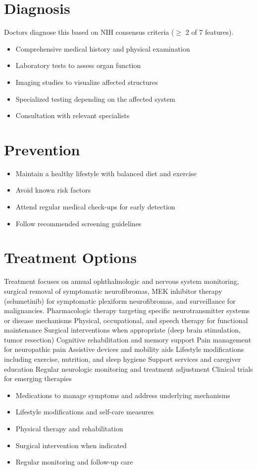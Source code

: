 \section{Diagnosis}
Doctors diagnose this based on NIH consensus criteria ($\ge$ 2 of 7 features).

\begin{itemize}[noitemsep]
  \item Comprehensive medical history and physical examination
  \item Laboratory tests to assess organ function
  \item Imaging studies to visualize affected structures
  \item Specialized testing depending on the affected system
  \item Consultation with relevant specialists
\end{itemize}
\section{Prevention}
\begin{itemize}[noitemsep]
  \item Maintain a healthy lifestyle with balanced diet and exercise
  \item Avoid known risk factors
  \item Attend regular medical check-ups for early detection
  \item Follow recommended screening guidelines
\end{itemize}
\section{Treatment Options}
Treatment focuses on annual ophthalmologic and nervous system monitoring, surgical removal of symptomatic neurofibromas, MEK inhibitor therapy (selumetinib) for symptomatic plexiform neurofibromas, and surveillance for malignancies. Pharmacologic therapy targeting specific neurotransmitter systems or disease mechanisms Physical, occupational, and speech therapy for functional maintenance Surgical interventions when appropriate (deep brain stimulation, tumor resection) Cognitive rehabilitation and memory support Pain management for neuropathic pain Assistive devices and mobility aids Lifestyle modifications including exercise, nutrition, and sleep hygiene Support services and caregiver education Regular neurologic monitoring and treatment adjustment Clinical trials for emerging therapies

\begin{itemize}[noitemsep]
  \item Medications to manage symptoms and address underlying mechanisms
  \item Lifestyle modifications and self-care measures
  \item Physical therapy and rehabilitation
  \item Surgical intervention when indicated
  \item Regular monitoring and follow-up care
\end{itemize}
